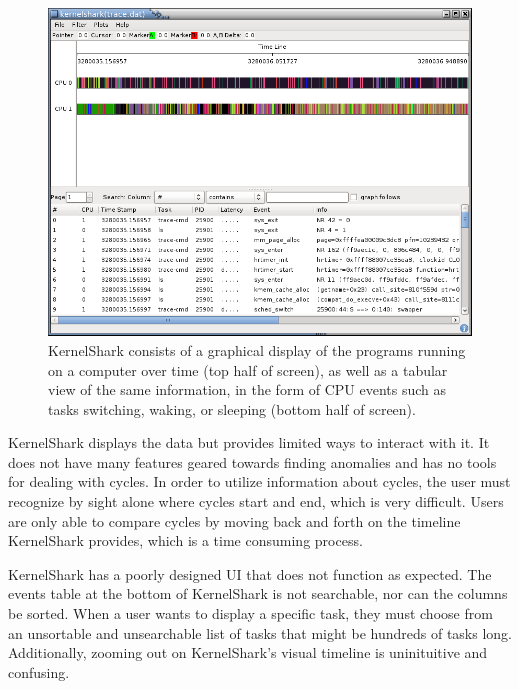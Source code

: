 \documentclass{hmcclinic}
\begin{document}
\begin{figure}[H]
  \centering
      \includegraphics[width=4.95in]{kshark-open.png}
  \caption{KernelShark consists of a graphical display of the programs running on a computer over time (top half of screen), as well as a tabular view of the same information, in the form of CPU events such as tasks switching, waking, or sleeping (bottom half of screen).}
\end{figure}

KernelShark displays the data but provides limited ways to interact with it. It
does not have many features geared towards finding anomalies and has no tools for
dealing with cycles.  In order to utilize information about cycles, the user
must recognize by sight alone where cycles start and end, which is very
difficult. Users are only able to compare cycles by moving back and forth on
the timeline KernelShark provides, which is a time consuming process.

KernelShark has a poorly designed UI that does not function as expected. The
events table at the bottom of KernelShark is not searchable, nor can the columns
be sorted. When a user wants to display a specific task, they must choose from
an unsortable and unsearchable list of tasks that might be hundreds of tasks
long. Additionally, zooming out on KernelShark's visual timeline is
uninituitive and confusing.

\end{document}
